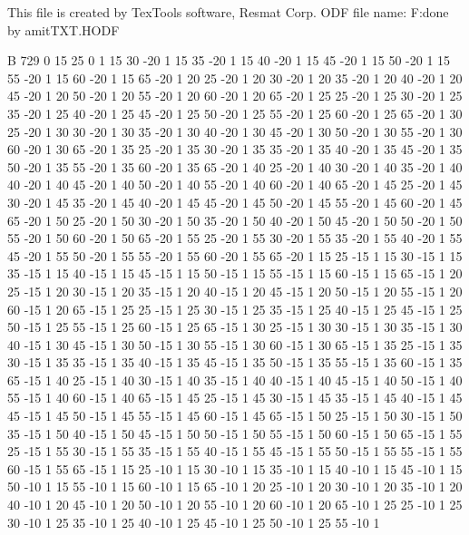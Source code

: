 This file is created by TexTools software, Resmat Corp.				
ODF file name: F:\Texture done by amit\Sol TXT\ODF.HODF				
				
B 729 0				
	15	25	0	1
	15	30	-20	1
	15	35	-20	1
	15	40	-20	1
	15	45	-20	1
	15	50	-20	1
	15	55	-20	1
	15	60	-20	1
	15	65	-20	1
	20	25	-20	1
	20	30	-20	1
	20	35	-20	1
	20	40	-20	1
	20	45	-20	1
	20	50	-20	1
	20	55	-20	1
	20	60	-20	1
	20	65	-20	1
	25	25	-20	1
	25	30	-20	1
	25	35	-20	1
	25	40	-20	1
	25	45	-20	1
	25	50	-20	1
	25	55	-20	1
	25	60	-20	1
	25	65	-20	1
	30	25	-20	1
	30	30	-20	1
	30	35	-20	1
	30	40	-20	1
	30	45	-20	1
	30	50	-20	1
	30	55	-20	1
	30	60	-20	1
	30	65	-20	1
	35	25	-20	1
	35	30	-20	1
	35	35	-20	1
	35	40	-20	1
	35	45	-20	1
	35	50	-20	1
	35	55	-20	1
	35	60	-20	1
	35	65	-20	1
	40	25	-20	1
	40	30	-20	1
	40	35	-20	1
	40	40	-20	1
	40	45	-20	1
	40	50	-20	1
	40	55	-20	1
	40	60	-20	1
	40	65	-20	1
	45	25	-20	1
	45	30	-20	1
	45	35	-20	1
	45	40	-20	1
	45	45	-20	1
	45	50	-20	1
	45	55	-20	1
	45	60	-20	1
	45	65	-20	1
	50	25	-20	1
	50	30	-20	1
	50	35	-20	1
	50	40	-20	1
	50	45	-20	1
	50	50	-20	1
	50	55	-20	1
	50	60	-20	1
	50	65	-20	1
	55	25	-20	1
	55	30	-20	1
	55	35	-20	1
	55	40	-20	1
	55	45	-20	1
	55	50	-20	1
	55	55	-20	1
	55	60	-20	1
	55	65	-20	1
	15	25	-15	1
	15	30	-15	1
	15	35	-15	1
	15	40	-15	1
	15	45	-15	1
	15	50	-15	1
	15	55	-15	1
	15	60	-15	1
	15	65	-15	1
	20	25	-15	1
	20	30	-15	1
	20	35	-15	1
	20	40	-15	1
	20	45	-15	1
	20	50	-15	1
	20	55	-15	1
	20	60	-15	1
	20	65	-15	1
	25	25	-15	1
	25	30	-15	1
	25	35	-15	1
	25	40	-15	1
	25	45	-15	1
	25	50	-15	1
	25	55	-15	1
	25	60	-15	1
	25	65	-15	1
	30	25	-15	1
	30	30	-15	1
	30	35	-15	1
	30	40	-15	1
	30	45	-15	1
	30	50	-15	1
	30	55	-15	1
	30	60	-15	1
	30	65	-15	1
	35	25	-15	1
	35	30	-15	1
	35	35	-15	1
	35	40	-15	1
	35	45	-15	1
	35	50	-15	1
	35	55	-15	1
	35	60	-15	1
	35	65	-15	1
	40	25	-15	1
	40	30	-15	1
	40	35	-15	1
	40	40	-15	1
	40	45	-15	1
	40	50	-15	1
	40	55	-15	1
	40	60	-15	1
	40	65	-15	1
	45	25	-15	1
	45	30	-15	1
	45	35	-15	1
	45	40	-15	1
	45	45	-15	1
	45	50	-15	1
	45	55	-15	1
	45	60	-15	1
	45	65	-15	1
	50	25	-15	1
	50	30	-15	1
	50	35	-15	1
	50	40	-15	1
	50	45	-15	1
	50	50	-15	1
	50	55	-15	1
	50	60	-15	1
	50	65	-15	1
	55	25	-15	1
	55	30	-15	1
	55	35	-15	1
	55	40	-15	1
	55	45	-15	1
	55	50	-15	1
	55	55	-15	1
	55	60	-15	1
	55	65	-15	1
	15	25	-10	1
	15	30	-10	1
	15	35	-10	1
	15	40	-10	1
	15	45	-10	1
	15	50	-10	1
	15	55	-10	1
	15	60	-10	1
	15	65	-10	1
	20	25	-10	1
	20	30	-10	1
	20	35	-10	1
	20	40	-10	1
	20	45	-10	1
	20	50	-10	1
	20	55	-10	1
	20	60	-10	1
	20	65	-10	1
	25	25	-10	1
	25	30	-10	1
	25	35	-10	1
	25	40	-10	1
	25	45	-10	1
	25	50	-10	1
	25	55	-10	1
